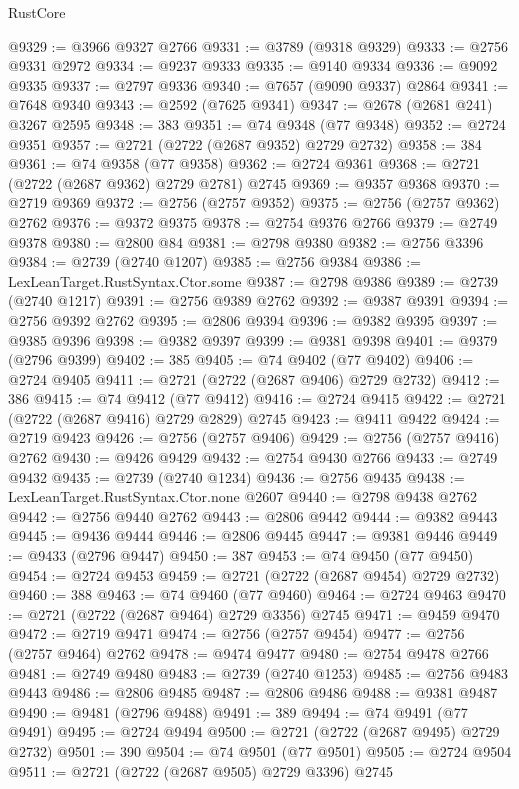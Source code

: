 \begin{lexlean}{RustCore}
\begin{coremodule}
@9329 := @3966 @9327 @2766
@9331 := @3789 (@9318 @9329)
@9333 := @2756 @9331 @2972
@9334 := @9237 @9333
@9335 := @9140 @9334
@9336 := @9092 @9335
@9337 := @2797 @9336
@9340 := @7657 (@9090 @9337) @2864
@9341 := @7648 @9340
@9343 := @2592 (@7625 @9341)
@9347 := @2678 (@2681 @241) @3267 @2595
@9348 := 383
@9351 := @74 @9348 (@77 @9348)
@9352 := @2724 @9351
@9357 := @2721 (@2722 (@2687 @9352) @2729 @2732)
@9358 := 384
@9361 := @74 @9358 (@77 @9358)
@9362 := @2724 @9361
@9368 := @2721 (@2722 (@2687 @9362) @2729 @2781) @2745
@9369 := @9357 @9368
@9370 := @2719 @9369
@9372 := @2756 (@2757 @9352)
@9375 := @2756 (@2757 @9362) @2762
@9376 := @9372 @9375
@9378 := @2754 @9376 @2766
@9379 := @2749 @9378
@9380 := @2800 @84
@9381 := @2798 @9380
@9382 := @2756 @3396
@9384 := @2739 (@2740 @1207)
@9385 := @2756 @9384
@9386 := LexLeanTarget.RustSyntax.Ctor.some
@9387 := @2798 @9386
@9389 := @2739 (@2740 @1217)
@9391 := @2756 @9389 @2762
@9392 := @9387 @9391
@9394 := @2756 @9392 @2762
@9395 := @2806 @9394
@9396 := @9382 @9395
@9397 := @9385 @9396
@9398 := @9382 @9397
@9399 := @9381 @9398
@9401 := @9379 (@2796 @9399)
@9402 := 385
@9405 := @74 @9402 (@77 @9402)
@9406 := @2724 @9405
@9411 := @2721 (@2722 (@2687 @9406) @2729 @2732)
@9412 := 386
@9415 := @74 @9412 (@77 @9412)
@9416 := @2724 @9415
@9422 := @2721 (@2722 (@2687 @9416) @2729 @2829) @2745
@9423 := @9411 @9422
@9424 := @2719 @9423
@9426 := @2756 (@2757 @9406)
@9429 := @2756 (@2757 @9416) @2762
@9430 := @9426 @9429
@9432 := @2754 @9430 @2766
@9433 := @2749 @9432
@9435 := @2739 (@2740 @1234)
@9436 := @2756 @9435
@9438 := LexLeanTarget.RustSyntax.Ctor.none @2607
@9440 := @2798 @9438 @2762
@9442 := @2756 @9440 @2762
@9443 := @2806 @9442
@9444 := @9382 @9443
@9445 := @9436 @9444
@9446 := @2806 @9445
@9447 := @9381 @9446
@9449 := @9433 (@2796 @9447)
@9450 := 387
@9453 := @74 @9450 (@77 @9450)
@9454 := @2724 @9453
@9459 := @2721 (@2722 (@2687 @9454) @2729 @2732)
@9460 := 388
@9463 := @74 @9460 (@77 @9460)
@9464 := @2724 @9463
@9470 := @2721 (@2722 (@2687 @9464) @2729 @3356) @2745
@9471 := @9459 @9470
@9472 := @2719 @9471
@9474 := @2756 (@2757 @9454)
@9477 := @2756 (@2757 @9464) @2762
@9478 := @9474 @9477
@9480 := @2754 @9478 @2766
@9481 := @2749 @9480
@9483 := @2739 (@2740 @1253)
@9485 := @2756 @9483 @9443
@9486 := @2806 @9485
@9487 := @2806 @9486
@9488 := @9381 @9487
@9490 := @9481 (@2796 @9488)
@9491 := 389
@9494 := @74 @9491 (@77 @9491)
@9495 := @2724 @9494
@9500 := @2721 (@2722 (@2687 @9495) @2729 @2732)
@9501 := 390
@9504 := @74 @9501 (@77 @9501)
@9505 := @2724 @9504
@9511 := @2721 (@2722 (@2687 @9505) @2729 @3396) @2745

\end{coremodule}
\end{lexlean}
